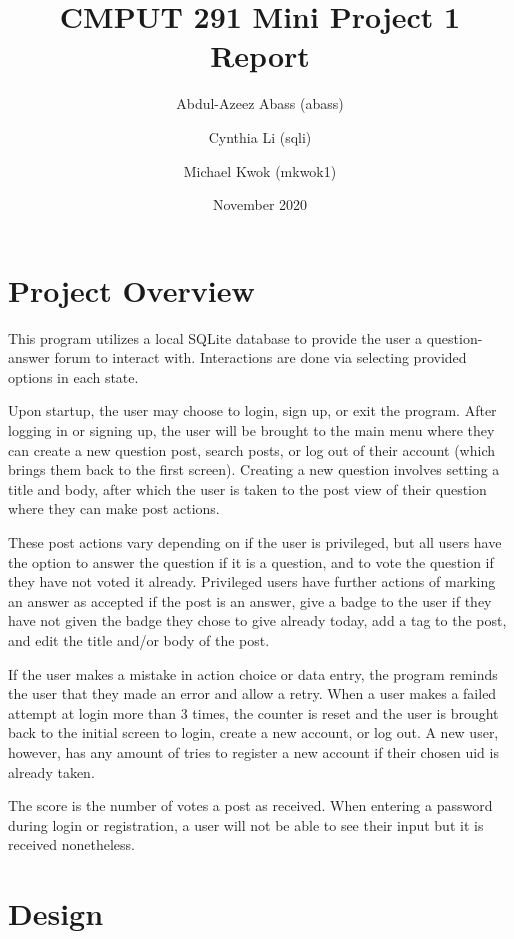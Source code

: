 \documentclass{article}
\title{CMPUT 291 Mini Project 1 Report}
\date{November 2020}
\author{Abdul-Azeez Abass (abass)\\
\and Cynthia Li (sqli)\\
\and Michael Kwok (mkwok1)}
\begin{document}
\maketitle

\section{Project Overview}

This program utilizes a local SQLite database to provide the user a question-answer forum to interact with. Interactions are done via selecting provided options in each state.

Upon startup, the user may choose to login, sign up, or exit the program. After logging in or signing up, the user will be brought to the main menu where they can create a new question post, search posts, or log out of their account (which brings them back to the first screen). Creating a new question involves setting a title and body, after which the user is taken to the post view of their question where they can make post actions.

These post actions vary depending on if the user is privileged, but all users have the option to answer the question if it is a question, and to vote the question if they have not voted it already. Privileged users have further actions of marking an answer as accepted if the post is an answer, give a badge to the user if they have not given the badge they chose to give already today, add a tag to the post, and edit the title and/or body of the post.

If the user makes a mistake in action choice or data entry, the program reminds the user that they made an error and allow a retry. When a user makes a failed attempt at login more than 3 times, the counter is reset and the user is brought back to the initial screen to login, create a new account, or log out. A new user, however, has any amount of tries to register a new account if their chosen uid is already taken.

The score is the number of votes a post as received. When entering a password during login or registration, a user will not be able to see their input but it is received nonetheless.

\section{Design}
\end{document}

